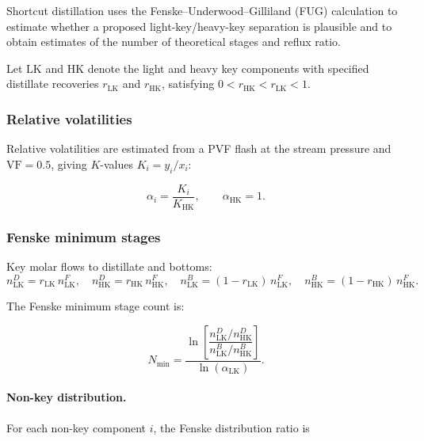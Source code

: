\documentclass[11pt,a4paper]{article}
\theoremstyle{definition}
\theoremstyle{plain}
\begin{document}
Shortcut distillation uses the Fenske--Underwood--Gilliland (FUG) calculation to estimate whether a proposed light-key/heavy-key separation is plausible and to obtain estimates of the number of theoretical stages and reflux ratio.

Let $\mathrm{LK}$ and $\mathrm{HK}$ denote the light and heavy key components with specified distillate recoveries $r_{\mathrm{LK}}$ and $r_{\mathrm{HK}}$, satisfying $0 < r_{\mathrm{HK}} < r_{\mathrm{LK}} < 1$.

\subsubsection{Relative volatilities}
\label{sec:relVol}

Relative volatilities are estimated from a PVF flash at the stream pressure and $\mathrm{VF} = 0.5$, giving $K$-values $K_i = y_i / x_i$:

\begin{equation}
 \alpha_i = \frac{K_i}{K_{\mathrm{HK}}},
 \qquad \alpha_{\mathrm{HK}} = 1.
\end{equation}

\subsubsection{Fenske minimum stages}
\label{sec:fenske}

Key molar flows to distillate and bottoms:
\begin{equation}
 n_{\mathrm{LK}}^D = r_{\mathrm{LK}}\, n_{\mathrm{LK}}^F,
 \quad
 n_{\mathrm{HK}}^D = r_{\mathrm{HK}}\, n_{\mathrm{HK}}^F,
 \quad
 n_{\mathrm{LK}}^B = (1-r_{\mathrm{LK}})\, n_{\mathrm{LK}}^F,
 \quad
 n_{\mathrm{HK}}^B = (1-r_{\mathrm{HK}})\, n_{\mathrm{HK}}^F.
\end{equation}

The Fenske minimum stage count is:

\begin{equation}
 N_{\min}
 = \frac{\ln\!\left[
   \dfrac{n_{\mathrm{LK}}^D / n_{\mathrm{HK}}^D}{
      n_{\mathrm{LK}}^B / n_{\mathrm{HK}}^B}
  \right]}{\ln(\alpha_{\mathrm{LK}})}.
 \label{eq:fenske}
\end{equation}

\paragraph{Non-key distribution.}
For each non-key component $i$, the Fenske distribution ratio is
\end{document}
